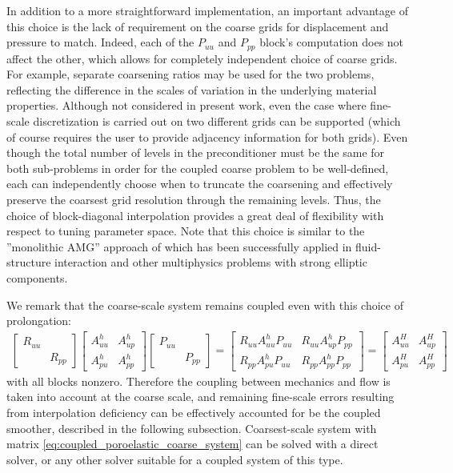 In addition to a more straightforward implementation, an important advantage of this choice is the lack of requirement on the coarse grids for displacement and pressure to match.   Indeed, each of the $P_{uu}$ and $P_{pp}$ block's computation does not affect the other, which allows for completely independent choice of coarse grids.   For example, separate coarsening ratios may be used for the two problems, reflecting the difference in the scales of variation in the underlying material properties.   Although not considered in present work, even the case where fine-scale discretization is carried out on two different grids can be supported (which of course requires the user to provide adjacency information for both grids).   Even though the total number of levels in the preconditioner must be the same for both sub-problems in order for the coupled coarse problem to be well-defined, each can independently choose when to truncate the coarsening and effectively preserve the coarsest grid resolution through the remaining levels.   Thus, the choice of block-diagonal interpolation provides a great deal of flexibility with respect to tuning parameter space.   Note that this choice is similar to the ''monolithic AMG'' approach of \cite{Gee2011,Verdugo2016} which has been successfully applied in fluid-structure interaction and other multiphysics problems with strong elliptic components.

We remark that the coarse-scale system remains coupled even with this choice of prolongation:
\begin{align}
    \begin{bmatrix}
		R_{uu} &       \\
		       & R_{pp}
	\end{bmatrix}
	\begin{bmatrix}
		A_{uu}^h & A_{up}^h \\
		A_{pu}^h & A_{pp}^h
	\end{bmatrix}
	\begin{bmatrix}
	    P_{uu} &       \\
		       & P_{pp}
	\end{bmatrix} =
	\begin{bmatrix}
	    R_{uu} A_{uu}^h P_{uu} & R_{uu} A_{up}^h P_{pp} \\
	    R_{pp} A_{pu}^h P_{uu} & R_{pp} A_{pp}^h P_{pp}
	\end{bmatrix} =
	\begin{bmatrix}
		A_{uu}^H & A_{up}^H \\
		A_{pu}^H & A_{pp}^H
	\end{bmatrix}
	\label{eq:coupled_poroelastic_coarse_system}
\end{align}
with all blocks nonzero.   Therefore the coupling between mechanics and flow is taken into account at the coarse scale, and remaining fine-scale errors resulting from interpolation deficiency can be effectively accounted for be the coupled smoother, described in the following subsection.   Coarsest-scale system with matrix \eqref{eq:coupled_poroelastic_coarse_system} can be solved with a direct solver, or any other solver suitable for a coupled system of this type.

